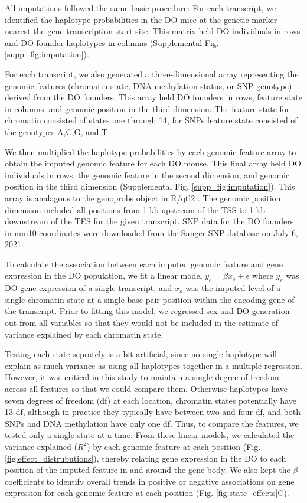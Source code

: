 \documentclass[
  11pt,
]{article}
\begin{document}
All imputations followed the same basic procedure: For each transcript,
we identified the haplotype probabilities in the DO mice at the genetic
marker nearest the gene transcription start site. This matrix held DO
individuals in rows and DO founder haplotypes in columns (Supplemental
Fig. \ref{supp_fig:imputation}).

For each transcript, we also generated a three-dimensional array
representing the genomic features (chromatin state, DNA methylation
status, or SNP genotype) derived from the DO founders. This array held
DO founders in rows, feature state in columns, and genomic position in
the third dimension. The feature state for chromatin consisted of states
one through 14, for SNPs feature state consisted of the genotypes A,C,G,
and T.

We then multiplied the haplotype probabilities by each genomic feature
array to obtain the imputed genomic feature for each DO mouse. This
final array held DO individuals in rows, the genomic feature in the
second dimension, and genomic position in the third dimension
(Supplemental Fig. \ref{supp_fig:imputation}). This array is analagous
to the genoprobs object in R/qtl2 \citep{pmid30591514}. The genomic
position dimension included all positions from 1 kb upstream of the TSS
to 1 kb downstream of the TES for the given transcript. SNP data for the
DO founders in mm10 coordinates were downloaded from the Sanger SNP
database \citep{keane2011mouse} on July 6, 2021.

To calculate the association between each imputed genomic feature and
gene expression in the DO population, we fit a linear model
\(y_{e} = \beta x_{s} + \epsilon\) where \(y_{e}\) was DO gene
expression of a single transcript, and \(x_{s}\) was the imputed level
of a single chromatin state at a single base pair position within the
encoding gene of the transcript. Prior to fitting this model, we
regressed sex and DO generation out from all variables so that they
would not be included in the estimate of variance explained by each
chromatin state.

Testing each state seprately is a bit artificial, since no single
haplotype will explain as much variance as using all haplotypes together
in a multiple regression. However, it was critical in this study to
maintain a single degree of freedom across all features so that we could
compare them. Otherwise haplotypes have seven degrees of freedom (df) at
each location, chromatin states potentially have 13 df, although in
practice they typically have between two and four df, and both SNPs and
DNA methylation have only one df. Thus, to compare the features, we
tested only a single state at a time. From these linear models, we
calculated the variance explained (\(R^2\)) by each genomic feature at
each position (Fig. \ref{fig:effect_distrubutions}), thereby relating
gene expression in the DO to each position of the imputed feature in and
around the gene body. We also kept the \(\beta\) coefficients to
identify overall trends in positive or negative associations on gene
expression for each genomic feature at each position (Fig.
\ref{fig:state_effects}C).
\end{document}
